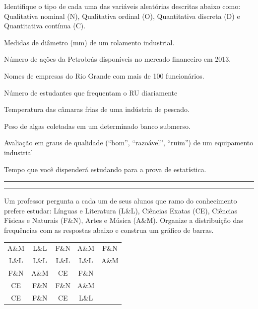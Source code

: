 \documentclass[a4paper,11pt,fleqn]{article}\usepackage[]{graphicx}\usepackage[]{color}
\theoremstyle{definition}
\begin{document}
\begin{compactenum}[4.]
\item Identifique o tipo de cada uma das variáveis aleatórias descritas
  abaixo como: Qualitativa nominal (N), Qualitativa ordinal
  (O), Quantitativa discreta (D) e Quantitativa contínua (C).
  \begin{compactenum}
   \item Medidas de diâmetro (mm) de um rolamento industrial.
   \item Número de ações da Petrobrás disponíveis no mercado financeiro
     em 2013.
   \item Nomes de empresas do Rio Grande com mais de 100 funcionários.
   \item Número de estudantes que frequentam o RU diariamente
   \item Temperatura das câmaras frias de uma indústria de pescado.
   \item Peso de algas coletadas em um determinado banco submerso.
   \item Avaliação em graus de qualidade (``bom'', ``razoável'',
     ``ruim'') de um equipamento industrial
   \item Tempo que você dispenderá estudando para a prova de
     estatística.
   \end{compactenum}
\end{compactenum}

\vspace{0.3cm}
\hrule
\vspace{0.3cm}

\clearpage

\vspace{0.3cm}
\hrule
\vspace{0.3cm}

\begin{compactenum}[5.]
\item Um professor pergunta a cada um de seus alunos que ramo do
  conhecimento prefere estudar: Línguas e Literatura (L\&L), Ciências
  Exatas (CE), Ciências Físicas e Naturais (F\&N), Artes e Música
  (A\&M). Organize a distribuição das frequências com as respostas
  abaixo e construa um gráfico de barras.
  \begin{table}[!h]
    \centering
    \begin{tabular}{ccccc}
      \hline
      A\&M & L\&L & F\&N & A\&M & F\&N \\
      L\&L & L\&L & L\&L & L\&L & A\&M\\
      F\&N & A\&M & CE & F\&N & \\
      CE & F\&N & F\&N & A\&M & \\
      CE & F\&N & CE & L\&L \\
      \hline
    \end{tabular}
  \end{table}
\end{compactenum}
\end{document}
